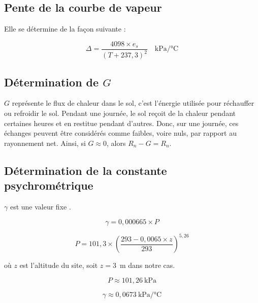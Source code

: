 \subsection{Pente de la courbe de vapeur}

Elle se détermine de la façon suivante \cite{koc_reference_2023} :

\begin{equation}
    \Delta = \frac{4098 \times e_s}{(T + 237{,}3)^2} \quad \text{kPa/°C}
    \label{eq:pente_vapeur}
\end{equation}

\subsection{Détermination de \texorpdfstring{$G$}{G}}

$G$ représente le flux de chaleur dans le sol, c'est l'énergie utilisée pour réchauffer ou refroidir le sol. Pendant une journée, le sol reçoit de la chaleur pendant certaines heures et en restitue pendant d'autres. Donc, sur une journée, ces échanges peuvent être considérés comme faibles, voire nuls, par rapport au rayonnement net. Ainsi, si $G \approx 0$, alors $R_n - G = R_n$.

\subsection{Détermination de la constante psychrométrique}

$\gamma$ est une valeur fixe \cite{koc_reference_2023}.

\begin{equation}
    \gamma = 0{,}000665 \times P
    \label{eq:gamma}
\end{equation}

\begin{equation}
    P = 101{,}3 \times \left(\frac{293 - 0{,}0065 \times z}{293}\right)^{5{,}26}
    \label{eq:pression_atm}
\end{equation}

\noindent où $z$ est l'altitude du site, soit $z = 3$~m dans notre cas.

\begin{equation}
    P \approx 101{,}26~\text{kPa}
    \label{eq:p_valeur}
\end{equation}

\begin{equation}
    \gamma \approx 0{,}0673~\text{kPa/°C}
    \label{eq:gamma_valeur}
\end{equation}


